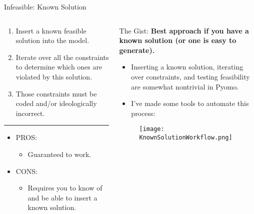 \documentclass[10pt, aspectratio=169]{beamer}
\begin{document}
\begin{frame}{Infeasible: Known Solution}
    \begin{columns}
        \begin{column}{0.5\textwidth}
            \begin{enumerate}
                \item Insert a known feasible solution into the model.
                \item Iterate over all the constraints to determine which ones are violated by this solution.
                \item Those constraints must be coded and/or ideologically incorrect.
            \end{enumerate}
            \hrule
            \vspace{0.1cm}
            \begin{itemize}
                \item PROS:
                \begin{itemize}
                    \item Guaranteed to work.
                \end{itemize}
                \item CONS:
                \begin{itemize}
                    \item Requires you to know of and be able to insert a known solution.
                \end{itemize}
            \end{itemize}
            
        \end{column}
        \begin{column}{0.5\textwidth}
            The Gist: \textbf{Best approach if you have a known solution (or one is easy to generate).}
            \begin{itemize}
                \item Inserting a known solution, iterating over constraints, and testing feasibility are somewhat nontrivial in Pyomo.
                \item I've made some tools to automate this process:
            \end{itemize}
            \begin{figure}
                \texttt{[image: KnownSolutionWorkflow.png]}
            \end{figure}
        \end{column}
    \end{columns}
\end{frame}
\end{document}
